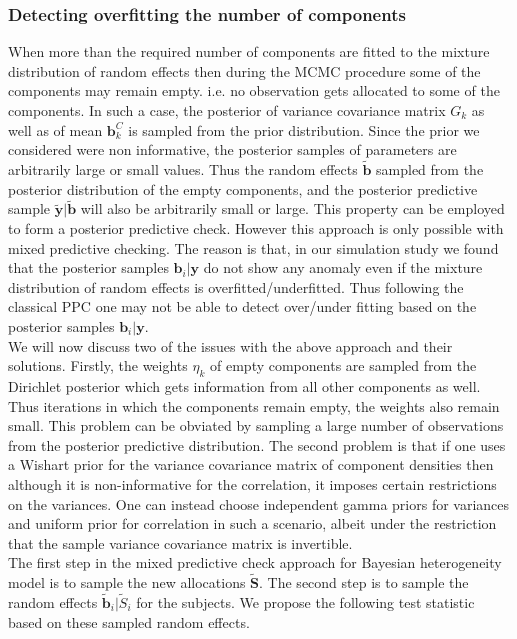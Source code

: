 \subsubsection{Detecting overfitting the number of components}
When more than the required number of components are fitted to the mixture distribution of random effects then  during the MCMC procedure some of the components may remain empty. i.e. no observation gets allocated to some of the components. In such a case, the posterior of variance covariance matrix $G_k$ as well as of mean $\boldsymbol{b}_k^C$ is sampled from the prior distribution. Since the prior we considered were non informative, the posterior samples of parameters are arbitrarily large or small values. Thus the random effects $\boldsymbol{\tilde{b}}$ sampled from the posterior distribution of the empty components, and the posterior predictive sample $\boldsymbol{\tilde{y}} | \boldsymbol{\tilde{b}}$ will also be arbitrarily small or large. This property can be employed to form a posterior predictive check. However this approach is only possible with mixed predictive checking. The reason is that, in our simulation study we found that the posterior samples $\boldsymbol{b}_i|\boldsymbol{y}$ do not show any anomaly even if the mixture distribution of random effects is overfitted/underfitted. Thus following the classical PPC one may not be able to detect over/under fitting based on the posterior samples $\boldsymbol{b}_i|\boldsymbol{y}$.\\

We will now discuss two of the issues with the above approach and their solutions. Firstly, the weights $\eta_k$ of empty components are sampled from the Dirichlet posterior which gets information from all other components as well. Thus iterations in which the components remain empty, the weights also remain small. This problem can be obviated by sampling a large number of observations from the posterior predictive distribution. The second problem is that if one uses a Wishart prior for the variance covariance matrix of component densities then although it is non-informative for the correlation, it imposes certain restrictions on the variances. One can instead choose independent gamma priors for variances and uniform prior for correlation in such a scenario, albeit under the restriction that the sample variance covariance matrix is invertible.\\

 The first step in the mixed predictive check approach for Bayesian heterogeneity model is to sample the new allocations $\boldsymbol{\tilde{S}}$. The second step is to sample the random effects $\boldsymbol{\tilde{b}}_i|\tilde{S}_i$ for the subjects. We propose the following test statistic based on these sampled random effects.

